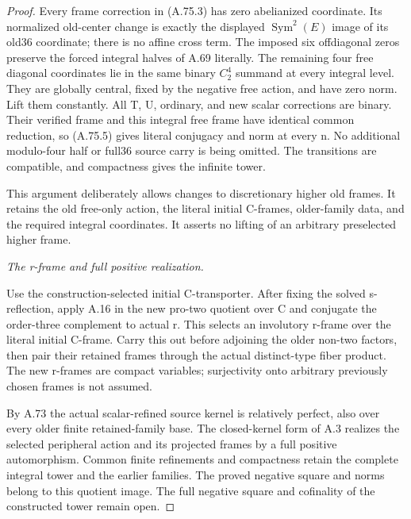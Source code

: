 \begin{proof}
Every frame correction in (A.75.3) has zero abelianized coordinate.
Its normalized old-center change is exactly the displayed
\(\operatorname{Sym}^2(E)\) image of its old36 coordinate;
there is no affine cross term. The imposed six offdiagonal zeros
preserve the forced integral halves of A.69 literally. The remaining
four free diagonal coordinates lie in the same binary \(C_2^4\)
summand at every integral level. They are globally central, fixed
by the negative free action, and have zero norm. Lift them
constantly. All T, U, ordinary, and new scalar corrections are
binary. Their verified frame and this integral free frame have
identical common reduction, so (A.75.5) gives literal conjugacy
and norm at every n. No additional modulo-four half or full36
source carry is being omitted. The transitions are compatible,
and compactness gives the infinite tower.

This argument deliberately allows changes to discretionary higher
old frames. It retains the old free-only action, the literal
initial C-frames, older-family data, and the required integral
coordinates. It asserts no lifting of an arbitrary preselected
higher frame.

\emph{The r-frame and full positive realization.}\par
Use the construction-selected initial C-transporter. After fixing
the solved s-reflection, apply A.16 in the new pro-two quotient
over C and conjugate the order-three complement to actual r.
This selects an involutory r-frame over the literal initial C-frame.
Carry this out before adjoining the older non-two factors, then
pair their retained frames through the actual distinct-type fiber
product. The new r-frames are compact variables; surjectivity onto
arbitrary previously chosen frames is not assumed.

By A.73 the actual scalar-refined source kernel is relatively
perfect, also over every older finite retained-family base.
The closed-kernel form of A.3 realizes the selected peripheral
action and its projected frames by a full positive automorphism.
Common finite refinements and compactness retain the complete
integral tower and the earlier families. The proved negative
square and norms belong to this quotient image. The full negative
square and cofinality of the constructed tower remain open.
\end{proof}
